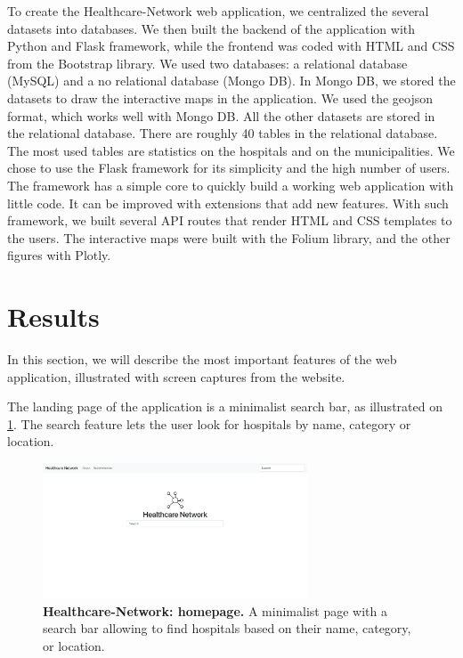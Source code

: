 To create the Healthcare-Network web application, we centralized the several datasets into databases. We then built the backend of the application with Python and Flask framework, while the frontend was coded with HTML and CSS from the Bootstrap library. We used two databases: a relational database (MySQL) and a no relational database (Mongo DB). In Mongo DB, we stored the datasets to draw the interactive maps in the application. We used the geojson format, which works well with Mongo DB. All the other datasets are stored in the relational database. There are roughly 40 tables in the relational database. The most used tables are statistics on the hospitals and on the municipalities. We chose to use the Flask framework for its simplicity and the high number of users. The framework has a simple core to quickly build a working web application with little code. It can be improved with extensions that add new features. With such framework, we built several API routes that render HTML and CSS templates to the users. The interactive maps were built with the Folium library, and the other figures with Plotly.

\section{Results}

In this section, we will describe the most important features of the web application, illustrated with screen captures from the website.

The landing page of the application is a minimalist search bar, as illustrated on \cref{fig:hn-home}. The search feature lets the user look for hospitals by name, category or location.

\begin{figure}[H]
    \includegraphics[width=0.7\textwidth]{images/healthcare-network/home.png}
    \centering
    \caption{
        \textbf{Healthcare-Network: homepage.} A minimalist page with a search bar allowing to find hospitals based on their name, category, or location.
    }
    \label{fig:hn-home}
\end{figure}

